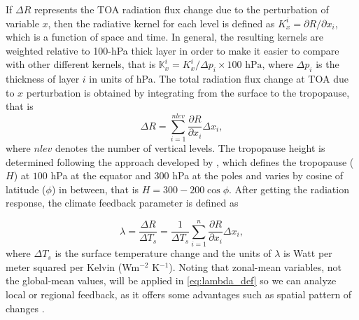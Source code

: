 If $\Delta R$ represents the TOA radiation flux change due to the perturbation of variable $x$, then the radiative kernel for each level is defined as $K^i_x = \partial R / \partial x_i$, which is a function of space and time. In general, the resulting kernels are weighted relative to 100-hPa thick layer in order to make it easier to compare with other different kernels, that is $\mathbb{K}^i_x = K^i_x / \Delta p_i \times 100\text{ hPa}$, where $\Delta p_i$ is the thickness of layer $i$ in units of hPa. The total radiation flux change at TOA due to $x$ perturbation is obtained by integrating from the surface to the tropopause, that is
\begin{equation}
\Delta R=\sum_{i=1}^{nlev} \frac{\partial R}{\partial x_i}{\Delta x_i},
\label{eq:delta_R_sum}
\end{equation}
where $nlev$ denotes the number of vertical levels. The tropopause height is determined following the approach developed by \cite{Soden2006}, which defines the tropopause ($H$) at $100$ hPa at the equator and $300$ hPa at the poles and varies by cosine of latitude ($\phi$) in between, that is $H=300-200 \cos\phi$. After getting the radiation response, the climate feedback parameter is defined as

\begin{equation}
\lambda = \frac{\Delta R}{\Delta T_s} = \frac{1}{\Delta T_s} \sum_{i=1}^{n} \frac{\partial R}{\partial x_i}\Delta x_i,
\label{eq:lambda_def}
\end{equation}
where $\Delta T_s$ is the surface temperature change and the units of $\lambda$ is Watt per meter squared per Kelvin (Wm$^{-2}$ K$^{-1}$).
Noting that zonal-mean variables, not the global-mean values, will be applied in \eqref{eq:lambda_def} so we can analyze local or regional feedback, as it offers some advantages such as spatial pattern of changes \citep{Feldl2013,Feldl2017}.

